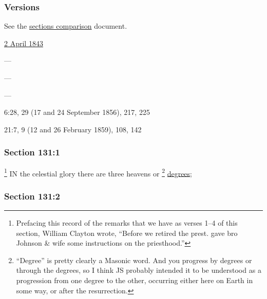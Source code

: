 	\subsubsection{Versions}
		\label{DC131-V}
		
		See the \href{https://drive.google.com/file/d/1goAvNz8jS4R8slYfMG_db55Ty2z_vmgK/view?usp=sharing}{sections comparison} document.
	
		\begin{compactdesc}
			\item[JSP] \hyperref[EMS-1843-JS-2-APR-1843]{2 April 1843}
			\item[BC] ---
			\item[DC 1835] ---
			\item[DC 1844] ---
			\item[DN] 6:28, 29 (17 and 24 September 1856), 217, 225
			\item[MS] 21:7, 9 (12 and 26 February 1859), 108, 142
		\end{compactdesc}

	\subsubsection{Section 131:1} %
		\label{DC131-1}

			\footnote{%
				Prefacing this record of the remarks that we have as verses 1--4 of this section, William Clayton wrote, ``Before we retired the prest. gave bro Johnson \& wife some instructions on the priesthood.''
				}%
		IN the celestial glory there are three heavens or
			\footnote{%
				``Degree'' is pretty clearly a Masonic word. And you progress by degrees or through the degrees, so I think JS probably intended it to be understood as a progression from one degree to the other, occurring either here on Earth in some way, or after the resurrection.
				}%
		\hyperref[DEGREE]{degrees};


	\subsubsection{Section 131:2} %
		\label{DC131-2}

